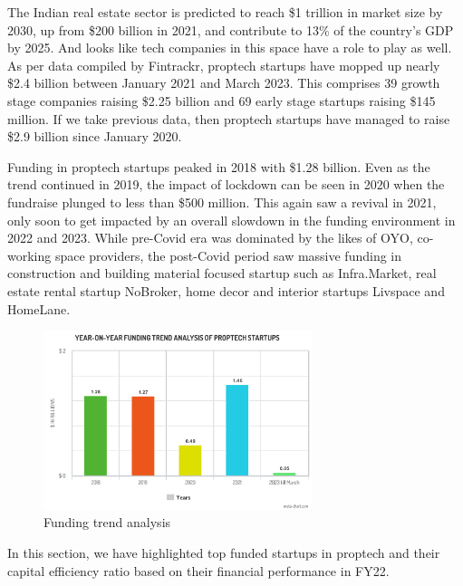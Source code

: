 The Indian real estate sector is predicted to reach \$1 trillion in market size by 2030, up from \$200 billion in 2021,
and contribute to 13\% of the country’s GDP by 2025.  And looks like tech companies in this space have a role to play as
well. As per data compiled by Fintrackr, proptech startups have mopped up nearly \$2.4 billion between January 2021 and
March 2023. This comprises 39 growth stage companies raising \$2.25 billion and 69 early stage startups raising \$145 million.
If we take previous data, then proptech startups have managed to raise \$2.9 billion since January 2020.\par
\smallskip

Funding in proptech startups peaked in 2018 with \$1.28 billion. Even as the trend continued in 2019, the impact of lockdown
can be seen in 2020 when the fundraise plunged to less than \$500 million. This again saw a revival in 2021,
only soon to get impacted by an overall slowdown in the funding environment in 2022 and 2023. While pre-Covid era was
dominated by the likes of OYO, co-working space providers, the post-Covid period saw massive funding in construction
and building material focused startup such as Infra.Market, real estate rental startup NoBroker, home decor and interior
startups Livspace and HomeLane.~\cite{growth-of-proptech-post-covid}\par

\begin{figure}[h]
      \centering
      \includegraphics[width=0.7\textwidth]{Images/meta-chart.png}
      \caption{Funding trend analysis}
\end{figure}

In this section, we have highlighted top funded startups in proptech and their capital efficiency ratio based on their
financial performance in FY22.\par\medskip

